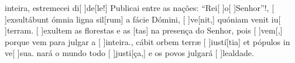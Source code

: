 {    { inteira, estremecei di[ ]{de}[le!] Publicai entre as nações: ``Rei[ ]{o}[ ]{Se}{nhor}''!},
  {[ ]{ex}sultábunt ómnia ligna sil[rum] a fácie Dómini, [ ]{ve}[nit,] quóniam venit iu[ ]{ter}ram.}%
    {[ ]{e}xultem as florestas e as [tas] na presença do Senhor, pois [ ]{vem}[,] porque vem para julgar a [ ]{in}{tei}ra.},
  {cábit orbem terræ [ ]{iu}{stí}[tia] et pópulos in ve[ ]{su}a.}%
    {nará o mundo todo [ ]{jus}{ti}[ça,] e os povos julgará [ ]{le}{al}{da}de.}
}